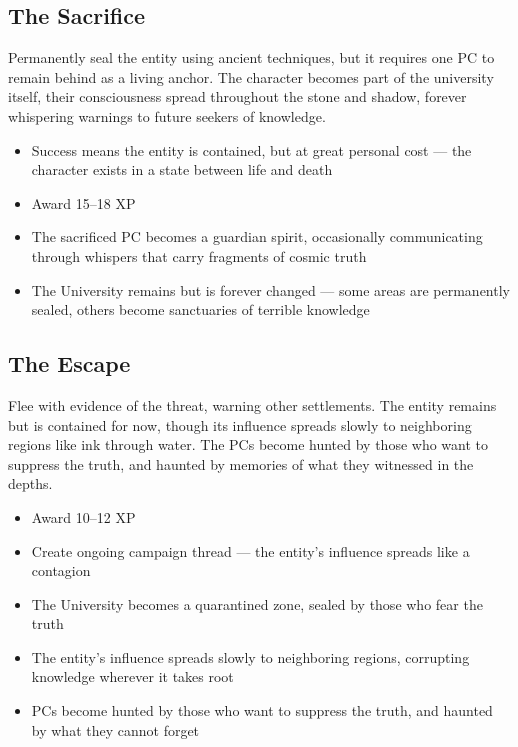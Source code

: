 \documentclass[11pt]{article}
\begin{document}
\subsection{The Sacrifice}

Permanently seal the entity using ancient techniques, but it requires one PC to remain behind as a living anchor. The character becomes part of the university itself, their consciousness spread throughout the stone and shadow, forever whispering warnings to future seekers of knowledge.

\begin{itemize}
\item Success means the entity is contained, but at great personal cost — the character exists in a state between life and death
\item Award 15–18 XP
\item The sacrificed PC becomes a guardian spirit, occasionally communicating through whispers that carry fragments of cosmic truth
\item The University remains but is forever changed — some areas are permanently sealed, others become sanctuaries of terrible knowledge
\end{itemize}

\subsection{The Escape}

Flee with evidence of the threat, warning other settlements. The entity remains but is contained for now, though its influence spreads slowly to neighboring regions like ink through water. The PCs become hunted by those who want to suppress the truth, and haunted by memories of what they witnessed in the depths.

\begin{itemize}
\item Award 10–12 XP
\item Create ongoing campaign thread — the entity's influence spreads like a contagion
\item The University becomes a quarantined zone, sealed by those who fear the truth
\item The entity's influence spreads slowly to neighboring regions, corrupting knowledge wherever it takes root
\item PCs become hunted by those who want to suppress the truth, and haunted by what they cannot forget
\end{itemize}
\end{document}
